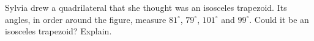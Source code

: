 Sylvia drew a quadrilateral that she thought was an isosceles trapezoid. Its angles, in order around the figure, measure $81^\circ$, $79^\circ$, $101^\circ$ and $99^\circ$. Could it be an isosceles trapezoid? Explain.
